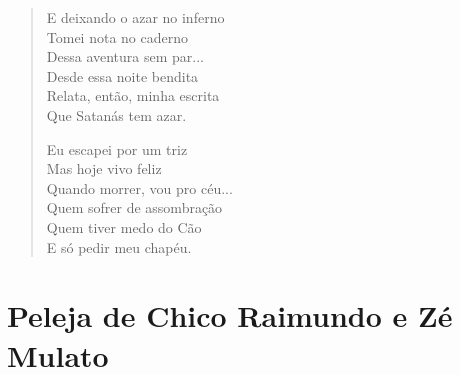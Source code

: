 \begin{verse}
E deixando o azar no inferno\\
Tomei nota no caderno\\
Dessa aventura sem par...\\
Desde essa noite bendita\\
Relata, então, minha escrita\\
Que Satanás tem azar.

Eu escapei por um triz\\
Mas hoje vivo feliz\\
Quando morrer, vou pro céu...\\
Quem sofrer de assombração\\
Quem tiver medo do Cão\\
E só pedir meu chapéu.
\end{verse}

\chapter{Peleja de Chico Raimundo e Zé Mulato}

